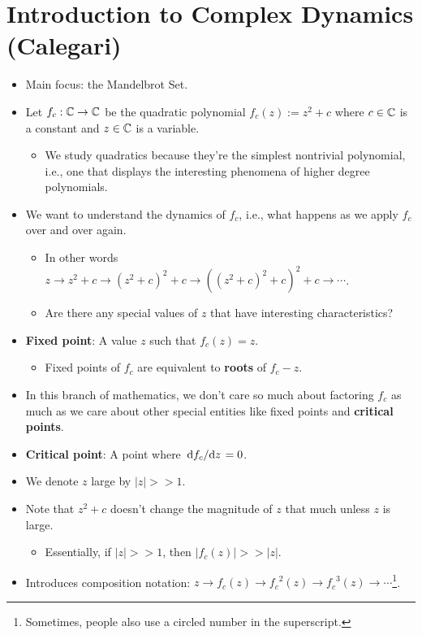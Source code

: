 \documentclass[../main.tex]{subfiles}
\begin{document}
\section{Introduction to Complex Dynamics (Calegari)}
\begin{itemize}
    \item Main focus: the Mandelbrot Set.
    \item Let $f_c:\mathbb{C}\to\mathbb{C}$ be the quadratic polynomial $f_c(z):=z^2+c$ where $c\in\mathbb{C}$ is a constant and $z\in\mathbb{C}$ is a variable.
    \begin{itemize}
        \item We study quadratics because they're the simplest nontrivial polynomial, i.e., one that displays the interesting phenomena of higher degree polynomials.
    \end{itemize}
    \item We want to understand the dynamics of $f_c$, i.e., what happens as we apply $f_c$ over and over again.
    \begin{itemize}
        \item In other words $z\to z^2+c\to (z^2+c)^2+c\to ((z^2+c)^2+c)^2+c\to\cdots$.
        \item Are there any special values of $z$ that have interesting characteristics?
    \end{itemize}
    \item \textbf{Fixed point}: A value $z$ such that $f_c(z)=z$.
    \begin{itemize}
        \item Fixed points of $f_c$ are equivalent to \textbf{roots} of $f_c-z$.
    \end{itemize}
    \item In this branch of mathematics, we don't care so much about factoring $f_c$ as much as we care about other special entities like fixed points and \textbf{critical points}.
    \item \textbf{Critical point}: A point where $\dv*{f_c}{z}=0$.
    \item We denote $z$ large by $|z|>>1$.
    \item Note that $z^2+c$ doesn't change the magnitude of $z$ that much unless $z$ is large.
    \begin{itemize}
        \item Essentially, if $|z|>>1$, then $|f_c(z)|>>|z|$.
    \end{itemize}
    \item Introduces composition notation: $z\to f_c(z)\to {f_c}^2(z)\to {f_c}^3(z)\to\cdots$\footnote{Sometimes, people also use a circled number in the superscript.}.

\end{itemize}
\end{document}
